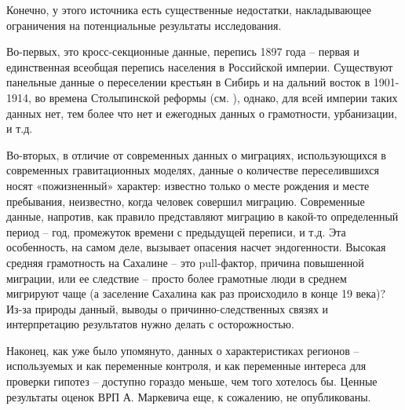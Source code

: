\documentclass[a4paper,12pt]{article}
\begin{document}

Конечно, у этого источника есть существенные недостатки, накладывающее ограничения на потенциальные результаты исследования.

Во-первых, это кросс-секционные данные, перепись 1897 года – первая и единственная всеобщая перепись населения в Российской империи. Существуют панельные данные о переселении крестьян в Сибирь и на дальний восток в 1901-1914, во времена Столыпинской реформы (см. \cite{chernina_property_2014}), однако, для всей империи таких данных нет, тем более что нет и ежегодных данных о грамотности, урбанизации, и т.д. 

Во-вторых, в отличие от современных данных о миграциях, использующихся в современных гравитационных моделях, данные о количестве переселившихся носят «пожизненный» характер: известно только о месте рождения и месте пребывания, неизвестно, когда человек совершил миграцию. Современные данные, напротив, как правило представляют миграцию в какой-то определенный период – год, промежуток времени с предыдущей переписи, и т.д. 
Эта особенность, на самом деле, вызывает опасения насчет эндогенности. 
Высокая средняя грамотность на Сахалине – это pull-фактор, причина повышенной миграции, или ее следствие – просто более грамотные люди в среднем мигрируют чаще (а заселение Сахалина как раз происходило в конце 19 века)? 
Из-за природы данный, выводы о причинно-следственных связях и интерпретацию результатов нужно делать с осторожностью.


Наконец, как уже было упомянуто, данных о характеристиках регионов – используемых и как переменные контроля, и как переменные интереса для проверки гипотез – доступно гораздо меньше, чем того хотелось бы. Ценные результаты оценок ВРП А. Маркевича еще, к сожалению, не опубликованы. 
\end{document}
